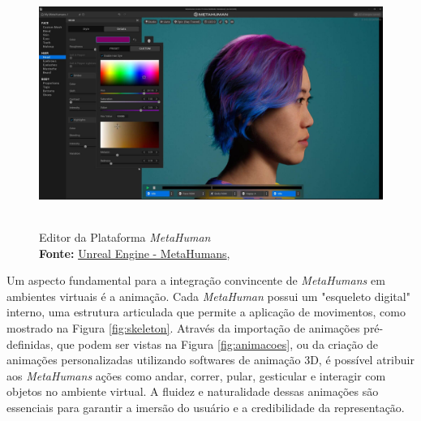 {    \begin{figure}[H]
        \centering
        \includegraphics[height=8cm, keepaspectratio]{img/unreal/metahuman create.jpg}
        \caption{Editor da Plataforma \textit{MetaHuman} \\
            \textbf{Fonte:} \href{https://cdn2.unrealengine.com/metahuman-overview-create-1920x1080-baa630fe8b02.jpg?resize=1&w=900}{Unreal Engine - MetaHumans},  \protect\citep{unrealenginemeta}}
        \label{fig:metahuman creator}
    \end{figure}
    
    Um aspecto fundamental para a integração convincente de \textit{MetaHumans} em ambientes virtuais é a animação. Cada \textit{MetaHuman} possui um "esqueleto digital" interno, uma estrutura articulada que permite a aplicação de movimentos, como mostrado na Figura \ref{fig:skeleton}. Através da importação de animações pré-definidas, que podem ser vistas na Figura \ref{fig:animacoes}, ou da criação de animações personalizadas utilizando softwares de animação 3D, é possível atribuir aos \textit{MetaHumans} ações como andar, correr, pular, gesticular e interagir com objetos no ambiente virtual. A fluidez e naturalidade dessas animações são essenciais para garantir a imersão do usuário e a credibilidade da representação.
    
}
